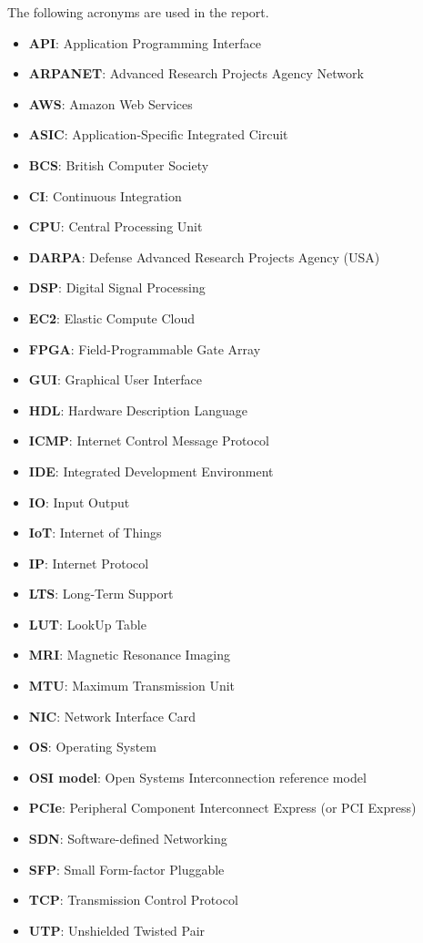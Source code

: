 The following acronyms are used in the report.
\begin{itemize}
  \item \textbf{API}: Application Programming Interface
  \item \textbf{ARPANET}: Advanced Research Projects Agency Network
  \item \textbf{AWS}: Amazon Web Services
  \item \textbf{ASIC}: Application-Specific Integrated Circuit
  \item \textbf{BCS}: British Computer Society
  \item \textbf{CI}: Continuous Integration
  \item \textbf{CPU}: Central Processing Unit
  \item \textbf{DARPA}: Defense Advanced Research Projects Agency (USA)
  \item \textbf{DSP}: Digital Signal Processing
  \item \textbf{EC2}: Elastic Compute Cloud
  \item \textbf{FPGA}: Field-Programmable Gate Array
  \item \textbf{GUI}: Graphical User Interface
  \item \textbf{HDL}: Hardware Description Language
  \item \textbf{ICMP}: Internet Control Message Protocol
  \item \textbf{IDE}: Integrated Development Environment
  \item \textbf{IO}: Input Output
  \item \textbf{IoT}: Internet of Things
  \item \textbf{IP}: Internet Protocol
  \item \textbf{LTS}: Long-Term Support
  \item \textbf{LUT}: LookUp Table
  \item \textbf{MRI}: Magnetic Resonance Imaging
  \item \textbf{MTU}: Maximum Transmission Unit
  \item \textbf{NIC}: Network Interface Card
  \item \textbf{OS}: Operating System
  \item \textbf{OSI model}: Open Systems Interconnection reference model
  \item \textbf{PCIe}: Peripheral Component Interconnect Express (or PCI Express)
  \item \textbf{SDN}: Software-defined Networking
  \item \textbf{SFP}: Small Form-factor Pluggable
  \item \textbf{TCP}: Transmission Control Protocol
  \item \textbf{UTP}: Unshielded Twisted Pair
\end{itemize}
